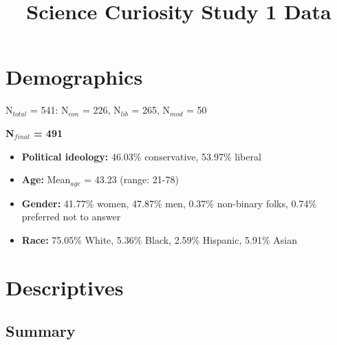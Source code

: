 \documentclass[
]{article}
\title{Science Curiosity Study 1 Data}
\author{}
\date{\vspace{-2.5em}}
\providecommand{\tightlist}{%
  \setlength{\itemsep}{0pt}\setlength{\parskip}{0pt}}
\begin{document}
\maketitle

\hypertarget{demographics}{%
\section{Demographics}\label{demographics}}

N\(_{total}\) = 541: N\(_{con}\) = 226, N\(_{lib}\) = 265, N\(_{mod}\) =
50

\textbf{N\(_{final}\) = 491}

\begin{itemize}
\tightlist
\item
  \textbf{Political ideology:} 46.03\% conservative, 53.97\% liberal
\item
  \textbf{Age:} Mean\(_{age}\) = 43.23 (range: 21-78)
\item
  \textbf{Gender:} 41.77\% women, 47.87\% men, 0.37\% non-binary folks,
  0.74\% preferred not to answer
\item
  \textbf{Race:} 75.05\% White, 5.36\% Black, 2.59\% Hispanic, 5.91\%
  Asian
\end{itemize}

\hypertarget{descriptives}{%
\section{Descriptives}\label{descriptives}}

\hypertarget{summary}{%
\subsection{Summary}\label{summary}}
\end{document}
